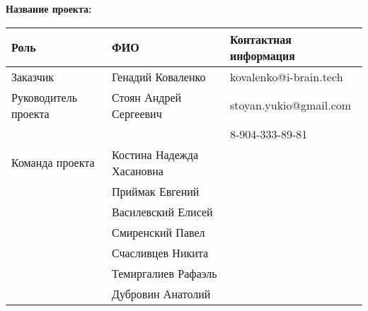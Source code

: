 \documentclass[a4paper,12pt]{article}
\begin{document}
\textbf{Название проекта: }

\vspace{5ex}


\begin{tabular}{|l|l|l|}
    \hline
    \textbf{Роль} & \textbf{ФИО} & \textbf{Контактная информация} \\
    \hline 
    Заказчик & Генадий Коваленко & kovalenko@i-brain.tech \\
    \hline
    Руководитель проекта & Стоян Андрей Сергеевич 
       & stoyan.yukio@gmail.com \\ 
     & & 8-904-333-89-81 \\ 
    \hline
    Команда проекта 
     & Костина Надежда Хасановна & \\ \cline{2-3}
     & Приймак Евгений & \\ \cline{2-3}
     & Василевский Елисей & \\ \cline{2-3}
     & Смиренский Павел & \\ \cline{2-3}
     & Счасливцев Никита & \\ \cline{2-3}
     & Темиргалиев Рафаэль & \\ \cline{2-3}
     & Дубровин Анатолий & \\
    \hline
\end{tabular}
\end{document}
